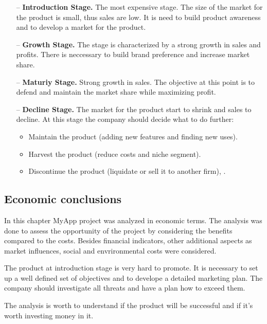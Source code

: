 \begin{itemize}

\item[--] \textbf{Introduction Stage.} The most expensive stage. The size of the market for the product is small, thus sales are low. It is need to build product awareness and to develop a market for the product.

\item[--] \textbf{Growth Stage.} The stage is characterized by a strong growth in sales and profits. There is neccessary to build brand preference and increase market share.

\item[--] \textbf{Maturiy Stage.} Strong growth in sales. The objective at this point is to defend and maintain the market share while maximizing profit. 

\item[--] \textbf{Decline Stage.} The market for the product start to shrink and sales to decline. At this stage the company should decide what to do further: 

\begin{itemize}

\item Maintain the product (adding new features and finding new uses).

\item Harvest the product (reduce costs and niche segment).

\item Discontinue the product (liquidate or sell it to another firm), \cite{stages}.

\end{itemize}
\end{itemize}

\subsection{Economic conclusions}

In this chapter MyApp project was analyzed in economic terms. The analysis was done to assess the opportunity of the project by considering the benefits compared to the costs. Besides financial indicators, other additional aspects as market influences, social and envrironmental costs were considered. 

The product at introduction stage is very hard to promote. It is necessary to set up a well defined set of objectives and to develope a detailed marketing plan. The company should investigate all threats and have a plan how to exceed them. 

The analysis is worth to understand if the product will be successful and if it's worth investing money in it.








